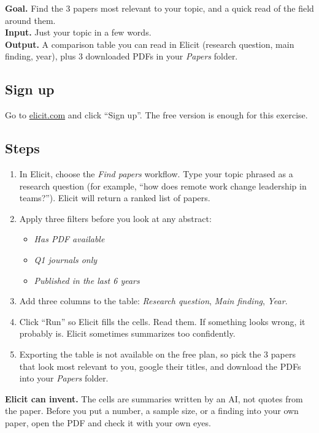 \documentclass[11pt,a4paper]{article}
\begin{document}
\begin{toolheader}
\textbf{Goal.} Find the 3 papers most relevant to your topic, and a quick read of the field around them.\\
\textbf{Input.} Just your topic in a few words.\\
\textbf{Output.} A comparison table you can read in Elicit (research question, main finding, year), plus 3 downloaded PDFs in your \emph{Papers} folder.
\end{toolheader}

\subsection*{Sign up}
Go to \href{https://elicit.com/}{elicit.com} and click ``Sign up''. The free version is enough for this exercise.

\subsection*{Steps}
\begin{enumerate}[leftmargin=*, itemsep=2pt]
  \item In Elicit, choose the \emph{Find papers} workflow. Type your topic phrased as a research question (for example, ``how does remote work change leadership in teams?''). Elicit will return a ranked list of papers.
  \item Apply three filters before you look at any abstract:
    \begin{itemize}[leftmargin=1.4em, itemsep=1pt]
      \item \emph{Has PDF available}
      \item \emph{Q1 journals only}
      \item \emph{Published in the last 6 years}
    \end{itemize}
  \item Add three columns to the table: \emph{Research question}, \emph{Main finding}, \emph{Year}.
  \item Click ``Run'' so Elicit fills the cells. Read them. If something looks wrong, it probably is. Elicit sometimes summarizes too confidently.
  \item Exporting the table is not available on the free plan, so pick the 3 papers that look most relevant to you, google their titles, and download the PDFs into your \emph{Papers} folder.
\end{enumerate}

\begin{watchout}
\textbf{Elicit can invent.} The cells are summaries written by an AI, not quotes from the paper. Before you put a number, a sample size, or a finding into your own paper, open the PDF and check it with your own eyes.
\end{watchout}
\end{document}
